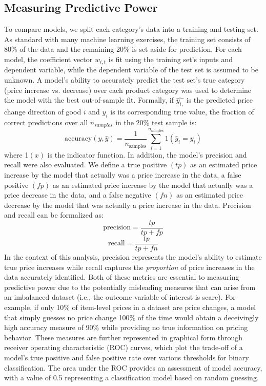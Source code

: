 \documentclass[11pt]{article}
\begin{document}
\subsection{Measuring Predictive Power}

To compare models, we split each category's data into a training and testing set. As standard with many machine learning exercises, the training set consists of 80\% of the data and the remaining 20\% is set aside for prediction. For each model, the coefficient vector $w_{i,t}$ is fit using the training set's inputs and dependent variable, while the dependent variable of the test set is assumed to be unknown. A model's ability to accurately predict the test set's true category (price increase vs. decrease) over each product category was used to determine the model with the best out-of-sample fit. Formally, if $\hat{y_{i,}}$ is the predicted price change direction of good $i$ and $y_{i}$ is its corresponding true value, the fraction of correct predictions over all $n_{samples}$ in the 20\% test sample is:
%
\begin{equation*}
    \text{accuracy}(y, \hat{y}) = \frac{1}{n_\text{samples}} \sum_{i=1}^{n_\text{samples}} 1(\hat{y}_i = y_i)
\end{equation*}
%
where 1$(x)$ is the indicator function. In addition, the model's precision and recall were also evaluated. We define a true positive $(tp)$ as an estimated price increase by the model that actually was a price increase in the data, a false positive $(fp)$ as an estimated price increase by the model that actually was a price decrease in the data, and a false negative $(fn)$ as an estimated price decrease by the model that was actually a price increase in the data. Precision and recall can be formalized as:
%
\begin{equation*}
    \text{precision} = \frac{tp}{tp + fp}
\end{equation*}
\begin{equation*}
    \text{recall} = \frac{tp}{tp + fn}
\end{equation*}
%
In the context of this analysis, precision represents the model's ability to estimate true price increases while recall captures the \textit{proportion} of price increases in the data accurately identified. Both of these metrics are essential to measuring predictive power due to the potentially misleading measures that can arise from an imbalanced dataset (i.e., the outcome variable of interest is scare). For example, if only 10\% of item-level prices in a dataset are price changes, a model that simply guesses no price change 100\% of the time would obtain a deceivingly high accuracy measure of 90\% while providing no true information on pricing behavior. These measures are further represented in graphical form through receiver operating characteristic (ROC) curves, which plot the trade-off of a model's true positive and false positive rate over various thresholds for binary classification. The area under the ROC provides an assessment of model accuracy, with a value of 0.5 representing a classification model based on random guessing.
\end{document}
